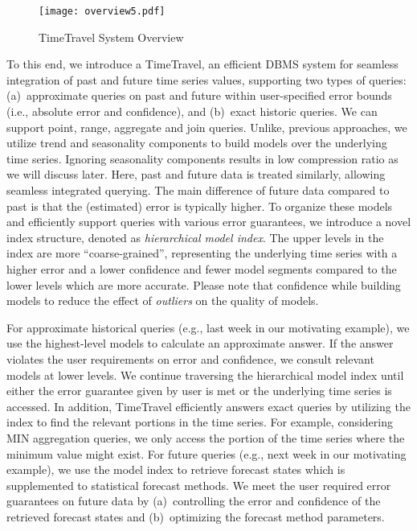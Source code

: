 \documentclass[10pt,conference,letterpaper]{IEEEtran}
\newcommand{\LN}{hierarchical model index}
\begin{document}


\begin{figure*}[th]
\center
\texttt{[image: overview5.pdf]}

\caption{TimeTravel System Overview}
\label{fig:arch}
\end{figure*} 



To this end, we introduce a  TimeTravel, an efficient DBMS system for seamless integration  of past and future time series values, supporting two types of queries:
(a)~approximate queries on past and future within user-specified error bounds (i.e., absolute error and confidence), and (b)~exact historic queries.
We can support point, range, aggregate and join queries.
Unlike, previous approaches, we utilize trend and seasonality components to build models over the underlying time series. Ignoring seasonality components results in low compression ratio as we will discuss later.  Here, past and future data is treated similarly, allowing seamless integrated querying. The main difference of future data compared to past is that the (estimated) error is typically higher.
To organize these models and efficiently support queries with various error guarantees, we introduce a novel index structure, denoted as {\em \LN}.  The upper levels in the index are more ``coarse-grained'', representing 
the underlying time series with a higher error and a lower confidence and fewer model segments compared to the lower levels which are more accurate. Please note that confidence while building models to reduce the effect of  {\it outliers} on the quality of models.

For approximate historical queries (e.g., last week in our motivating example), we use the highest-level models to calculate an approximate answer. If the  answer 
violates the user requirements on error and confidence, we consult relevant models at lower levels.  We continue traversing the hierarchical model index until either the error guarantee given by user is met or the underlying time series is accessed.
In addition, TimeTravel efficiently answers exact queries by utilizing the index  to find the relevant portions in the time series. For example, considering MIN aggregation queries, we only access the portion of the time series where the minimum value might exist. 
For future queries (e.g., next week in our motivating example), we use the model index to retrieve forecast states which is supplemented to  statistical forecast methods.
We meet the user required error guarantees on future data by (a)~controlling the error and confidence of the  retrieved forecast states and (b)~optimizing the forecast method parameters. 
\end{document}
